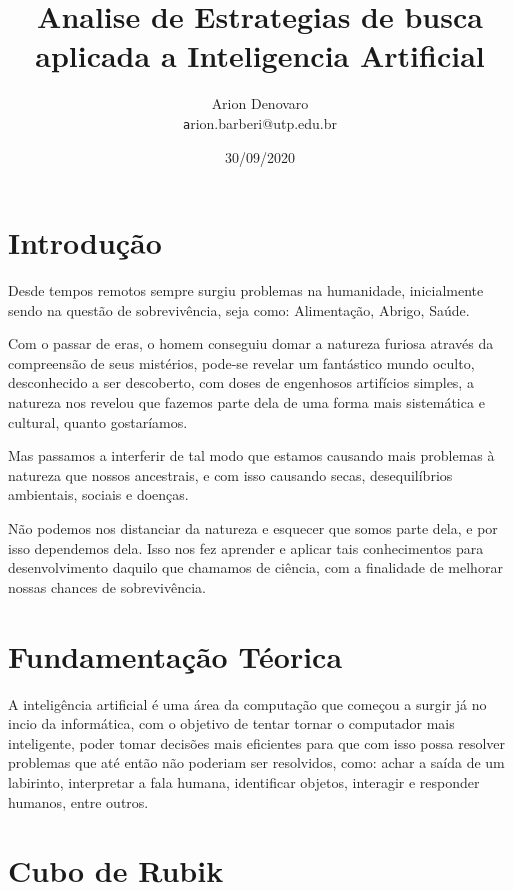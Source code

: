 \documentclass[12pt,a4paper,twocolumn]{article}
\title{Analise de Estrategias de busca aplicada a Inteligencia Artificial}
\date{30/09/2020}
\author{Arion Denovaro  \\ \texttt  arion.barberi@utp.edu.br}
\begin{document}
\maketitle
\newpage  


\section{Introdução}
  	Desde tempos remotos sempre surgiu problemas na humanidade, inicialmente sendo na questão de sobrevivência, seja como: Alimentação, Abrigo, Saúde.	

	Com o passar  de eras, o homem conseguiu domar a natureza furiosa através da compreensão de seus mistérios, pode-se revelar um fantástico mundo oculto, desconhecido a ser descoberto, com doses de engenhosos artifícios simples, a natureza nos revelou que fazemos parte dela de uma forma mais sistemática e cultural, quanto gostaríamos.

	Mas passamos a interferir de tal modo que estamos causando mais problemas à natureza que nossos ancestrais, e com isso causando secas, desequilíbrios ambientais, sociais e doenças. 

	Não podemos nos distanciar da natureza e esquecer que somos parte dela, e por isso dependemos dela. Isso nos fez aprender e aplicar tais conhecimentos para desenvolvimento daquilo que chamamos de ciência, com a finalidade de melhorar nossas chances de sobrevivência.



\section{Fundamentação Téorica}
A inteligência artificial é uma área da computação que começou a surgir já no incio da informática, com o objetivo de tentar tornar o computador mais inteligente, poder tomar decisões mais eficientes para que com isso possa resolver problemas que até então não poderiam ser resolvidos, como: achar a saída de um labirinto, interpretar a fala humana, identificar objetos, interagir e responder humanos, entre outros.

 

\section{Cubo de Rubik}
\end{document}
